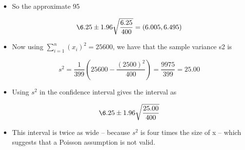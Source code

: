 \documentclass[a4paper,12pt]{article}
\begin{document}
\begin{enumerate}
\begin{itemize}
\item So the approximate 95%


\[  \6.25\pm 1.96 \sqrt{ \frac{6.25}{400} } = \left(6.005, 6.495\right)\]

\item Now using $\sum^{n}_{i=1}(x_i)^2=25600$, we have that the sample variance s2 is

\[  s^2 = \frac{1}{399} \left( 25600 - \frac{(2500)^2}{400} \right)  = \frac{9975}{399} = 25.00 \]

\item Using $s^2$ in the confidence interval gives the interval as

\[  \6.25\pm 1.96 \sqrt{ \frac{25.00}{400} }\]

\item This interval is twice as wide – because $s^2$ is four times the size of x – which
suggests that a Poisson assumption is not valid.
\end{itemize}
\end{enumerate}
\end{document}
